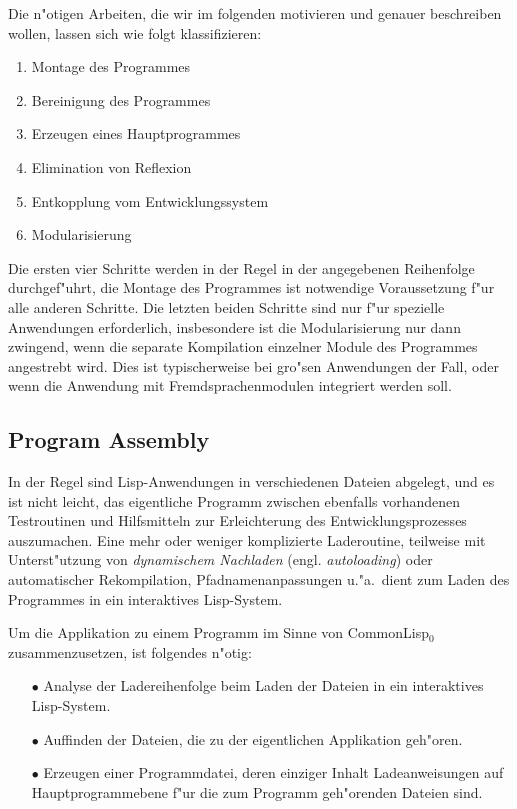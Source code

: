 Die n"otigen Arbeiten, die wir im folgenden motivieren und genauer
beschreiben wollen, lassen sich wie folgt klassifizieren:

\begin{enumerate}
\item Montage des Programmes
\item Bereinigung des Programmes
\item Erzeugen eines Hauptprogrammes
\item Elimination von Reflexion
\item Entkopplung vom Entwicklungssystem
\item Modularisierung
\end{enumerate}

Die ersten vier Schritte werden in der Regel in der angegebenen
Reihenfolge durchgef"uhrt, die Montage des Programmes ist notwendige
Voraussetzung f"ur alle anderen Schritte. Die letzten beiden Schritte
sind nur f"ur spezielle Anwendungen erforderlich, insbesondere ist die
Modularisierung nur dann zwingend, wenn die separate Kompilation
einzelner Module des Programmes angestrebt wird. Dies ist
typischerweise bei gro"sen Anwendungen der Fall, oder wenn
die Anwendung mit Fremdsprachenmodulen integriert werden soll.


\subsection{Program Assembly}

In der Regel sind Lisp-Anwendungen in verschiedenen Dateien abgelegt,
und es ist nicht leicht, das eigentliche Programm zwischen ebenfalls
vorhandenen Testroutinen und Hilfsmitteln zur Erleichterung des
Entwicklungsprozesses auszumachen. Eine mehr oder weniger komplizierte
Laderoutine, teilweise mit Unterst"utzung von {\em dynamischem
Nachladen} (engl. {\em autoloading}) oder automatischer Rekompilation,
Pfadnamenanpassungen u."a.\ dient zum Laden des Programmes in ein
interaktives Lisp-System. 

Um die Applikation zu einem Programm im Sinne von CommonLisp$_0$
zusammenzusetzen, ist folgendes n"otig:

\begin{itemize} 
\item[$\bullet$] Analyse der Ladereihenfolge beim Laden der Dateien in
ein interaktives Lisp-System. 
\item[$\bullet$] Auffinden der Dateien, die zu der eigentlichen Applikation
geh"oren.
\item[$\bullet$] Erzeugen einer Programmdatei, deren einziger Inhalt
Ladeanweisungen auf Haupt\-pro\-gramm\-ebe\-ne f"ur die zum Programm
geh"orenden Dateien sind.
\end{itemize}

